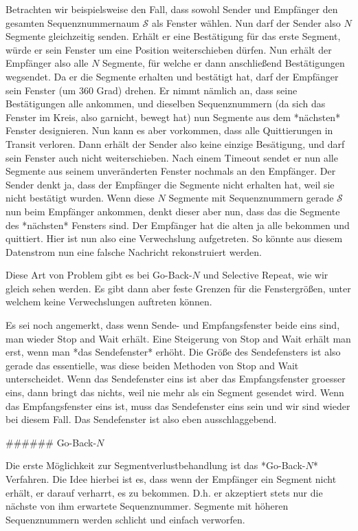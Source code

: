 Betrachten wir beispielsweise den Fall, dass sowohl Sender und Empfänger den
gesamten Sequenznummernaum $\mathcal{S}$ als Fenster wählen. Nun darf der Sender
also $N$ Segmente gleichzeitig senden. Erhält er eine Bestätigung für das erste
Segment, würde er sein Fenster um eine Position weiterschieben dürfen. Nun
erhält der Empfänger also alle $N$ Segmente, für welche er dann anschließend
Bestätigungen wegsendet. Da er die Segmente erhalten und bestätigt hat, darf der
Empfänger sein Fenster (um 360 Grad) drehen. Er nimmt nämlich an, dass seine
Bestätigungen alle ankommen, und dieselben Sequenznummern (da sich das Fenster
im Kreis, also garnicht, bewegt hat) nun Segmente aus dem *nächsten* Fenster
designieren. Nun kann es aber vorkommen, dass alle Quittierungen in Transit
verloren. Dann erhält der Sender also keine einzige Besätigung, und darf sein
Fenster auch nicht weiterschieben. Nach einem Timeout sendet er nun alle
Segmente aus seinem unveränderten Fenster nochmals an den Empfänger. Der Sender
denkt ja, dass der Empfänger die Segmente nicht erhalten hat, weil sie nicht
bestätigt wurden. Wenn diese $N$ Segmente mit Sequenznummern gerade
$\mathcal{S}$ nun beim Empfänger ankommen, denkt dieser aber nun, dass das die
Segmente des *nächsten* Fensters sind. Der Empfänger hat die alten ja alle
bekommen und quittiert. Hier ist nun also eine Verwechslung aufgetreten. So
könnte aus diesem Datenstrom nun eine falsche Nachricht rekonstruiert werden.

Diese Art von Problem gibt es bei Go-Back-$N$ und Selective Repeat, wie wir
gleich sehen werden. Es gibt dann aber feste Grenzen für die Fenstergrößen,
unter welchem keine Verwechslungen auftreten können.

Es sei noch angemerkt, dass wenn Sende- und Empfangsfenster beide eins sind, man
wieder Stop and Wait erhält. Eine Steigerung von Stop and Wait erhält man erst,
wenn man *das Sendefenster* erhöht. Die Größe des Sendefensters ist also gerade
das essentielle, was diese beiden Methoden von Stop and Wait unterscheidet. Wenn
das Sendefenster eins ist aber das Empfangsfenster groesser eins, dann bringt
das nichts, weil nie mehr als ein Segment gesendet wird. Wenn das
Empfangsfenster eins ist, muss das Sendefenster eins sein und wir sind wieder
bei diesem Fall. Das Sendefenster ist also eben ausschlaggebend.

###### Go-Back-$N$

Die erste Möglichkeit zur Segmentverlustbehandlung ist das *Go-Back-$N$*
Verfahren. Die Idee hierbei ist es, dass wenn der Empfänger ein Segment nicht
erhält, er darauf verharrt, es zu bekommen. D.h. er akzeptiert stets nur die
nächste von ihm erwartete Sequenznummer. Segmente mit höheren Sequenznummern
werden schlicht und einfach verworfen.

